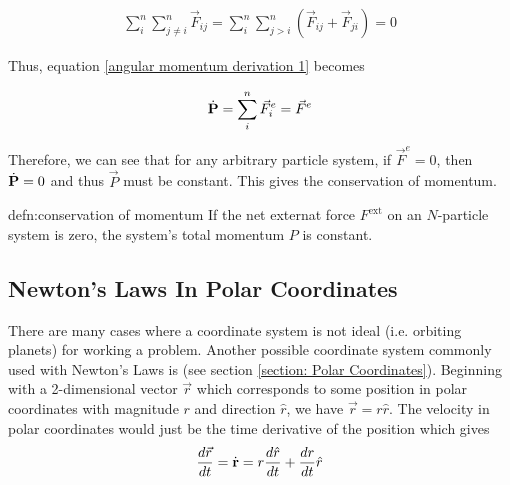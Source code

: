 \begin{align}
\sum_{i}^{n}\sum_{j\neq i}^{n} \vec{F}_{ij} = \sum_{i}^{n}\sum_{j > i}^{n} \left(\vec{F}_{ij} + \vec{F}_{ji}\right) = 0
\end{align} 

Thus, equation \ref{angular momentum derivation 1} becomes

\begin{align}
\dot{\text{\textbf{P}}} = \sum_{i}^{n} \vec{F}_i^e = \vec{F}^e
\end{align}

Therefore, we can see that for any arbitrary particle system, if $\vec{F}^e = 0$, then $\dot{\text{\textbf{P}}} = 0$ and thus $\vec{P}$ must be constant. This gives the conservation of momentum.

\begin{defn}{defn:conservation of momentum}
If the net externat force $F^{\text{ext}}$ on an $N$-particle system is zero, the system's total momentum $P$ is constant.
\end{defn}




\subsection{Newton's Laws In Polar Coordinates}

There are many cases where a  coordinate system is not ideal (i.e. orbiting planets) for working a problem. Another possible coordinate system commonly used with Newton's Laws is  (see section \ref{section: Polar Coordinates}). Beginning with a 2-dimensional vector $\vec{r}$ which corresponds to some position in polar coordinates with magnitude $r$ and direction $\hat{r}$, we have $\vec{r} = r\hat{r}$. The velocity in polar coordinates would just be the time derivative of the position which gives
\begin{align}
\frac{d \vec{r}}{dt} = \dot{\text{\textbf{r}}}= r\frac{d\hat{r}}{dt} + \frac{dr}{dt}\hat{r}
\end{align}
















